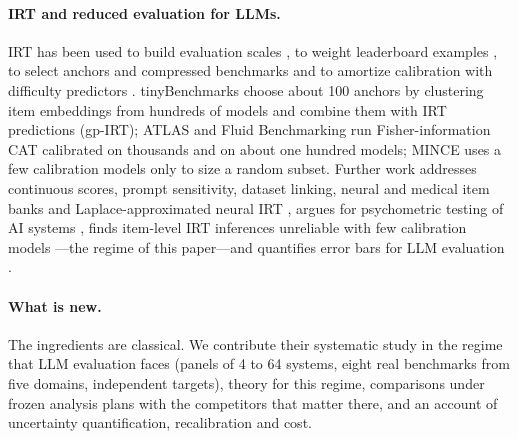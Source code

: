 \paragraph{IRT and reduced evaluation for LLMs.} IRT has been used to build evaluation
scales \citep{lalor2016building}, to weight leaderboard examples \citep{rodriguez2021evaluation},
to select anchors and compressed benchmarks
\citep{vivek2024anchor,polo2024tinybenchmarks,kipnis2025metabench} and to amortize
calibration with difficulty predictors \citep{truong2025reliable}. tinyBenchmarks choose about
100 anchors by clustering item embeddings from hundreds of models and combine them with IRT
predictions (gp-IRT); ATLAS \citep{li2026atlas} and Fluid Benchmarking
\citep{hofmann2025fluid} run Fisher-information CAT calibrated on thousands and on about one
hundred models; MINCE \citep{das2026mince} uses a few calibration models only to size a
random subset. Further work addresses continuous scores, prompt sensitivity, dataset linking,
neural and medical item banks and Laplace-approximated neural IRT
\citep{balkir2026confident,jo2025measure,habba2026growing,zhou2026lost,zheng2026medcat,mandujano2026laplace},
argues for psychometric testing of AI systems \citep{zhuang2025position}, finds item-level IRT
inferences unreliable with few calibration models \citep{jiang2026trust}---the regime of this
paper---and quantifies error bars for LLM evaluation \citep{madaan2024quantifying,miller2024adding}.

\paragraph{What is new.} The ingredients are classical. We contribute their systematic study
in the regime that LLM evaluation faces (panels of 4 to 64 systems, eight real benchmarks from
five domains, independent targets), theory for this regime, comparisons under frozen analysis
plans with the competitors that matter there, and an account of uncertainty quantification,
recalibration and cost.
